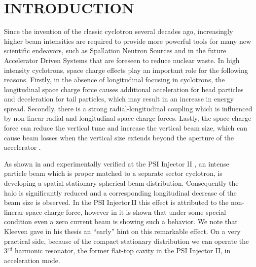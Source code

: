 \documentclass[aps,prstab,twocolumn,superscriptaddress,showpacs]{revtex4}
\begin{document}
\section{INTRODUCTION \label{intro}}
Since the invention of the classic cyclotron several decades ago, increasingly higher beam intensities are required  
to provide more powerful tools for many new scientific endeavors, such as Spallation Neutron Sources
and in the future Accelerator Driven Systems that are foreseen to reduce nuclear waste.
In high intensity cyclotrons, space charge effects play an important role for the following reasons.
Firstly, in the absence of longitudinal focusing in cyclotrons, the longitudinal space charge force causes additional acceleration for 
head particles and deceleration for tail particles, which may result in an increase in energy spread. Secondly, there is a strong 
radial-longitudinal coupling which is influenced by non-linear radial and longitudinal space charge forces. 
Lastly, the space charge force can reduce the vertical tune and increase the vertical beam size, which can cause beam losses when the vertical size 
extends beyond the aperture of the accelerator \cite{Baartman:1}.

As shown in \cite{Adam:0,Adam:1,Adam:2, Bert:2001,Ada:1,Poz:1} and experimentally verified at the PSI Injector II \cite{HumbPC}, an intense particle beam which is proper matched to a separate sector cyclotron, 
is developing a spatial stationary spherical beam distribution. Consequently the halo is significantly reduced and a corresponding longitudinal decrease of the beam size is observed. 
In the PSI Injector\,II this effect is attributed to the non-linerar space charge force, however in \cite{Bert:2001} it is shown that under some special condition even a zero current 
beam is showing such a behavior. We note that Kleeven gave in his thesis \cite{kleeven:1} an ``early'' hint on this remarkable effect. On a very practical side, because of the compact stationary distribution 
we can operate the 3$^{rd}$ harmonic resonator, the former flat-top cavity in the PSI Injector II, in acceleration mode.
\end{document}
